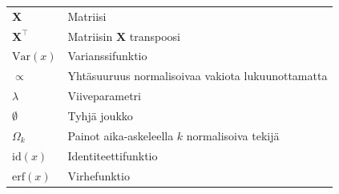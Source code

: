\documentclass[
  12pt,
  a4paper, twoside]{book}
\begin{document}
\begin{table}
\begin{tabular}[t]{ll}
$\mathbf{X}$ & Matriisi\\
$\mathbf{X}^\top$ & Matriisin $\mathbf{X}$ transpoosi\\
$\text{Var}(x)$ & Varianssifunktio\\
\addlinespace
$\propto$ & Yhtäsuuruus normalisoivaa vakiota lukuunottamatta\\
$\lambda$ & Viiveparametri\\
$\emptyset$ & Tyhjä joukko\\
$\Omega_k$ & Painot aika-askeleella $k$ normalisoiva tekijä\\
$\text{id}(x)$ & Identiteettifunktio\\
\addlinespace
$\text{erf}(x)$ & Virhefunktio\\
\bottomrule
\end{tabular}
\end{table}
\end{document}
